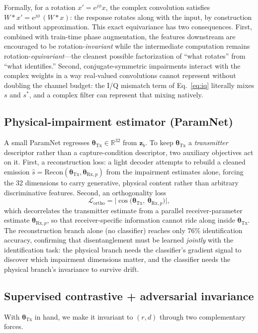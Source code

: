 \documentclass[journal]{IEEEtran}
\newcommand{\tx}{\boldsymbol{\theta}_{\mathrm{Tx}}}
\newcommand{\rxp}{\boldsymbol{\theta}_{\mathrm{Rx},p}}
\begin{document}
Formally, for a rotation $x' = e^{j\phi} x$, the complex convolution satisfies $W * x' = e^{j\phi}\,(W * x)$: the response rotates along with the input, by construction and without approximation. This exact equivariance has two consequences. First, combined with train-time phase augmentation, the features downstream are encouraged to be rotation-\emph{invariant} while the intermediate computation remains rotation-\emph{equivariant}---the cleanest possible factorization of ``what rotates'' from ``what identifies.'' Second, conjugate-symmetric impairments interact with the complex weights in a way real-valued convolutions cannot represent without doubling the channel budget: the I/Q mismatch term of Eq.~\eqref{eq:iq} literally mixes $s$ and $s^{*}$, and a complex filter can represent that mixing natively.

\subsection{Physical-impairment estimator (ParamNet)}
\label{sec:paramnet}
A small ParamNet regresses $\tx\in\mathbb{R}^{32}$ from $\mathbf{z}_b$. To keep $\tx$ a \emph{transmitter} descriptor rather than a capture-condition descriptor, two auxiliary objectives act on it. First, a reconstruction loss: a light decoder attempts to rebuild a cleaned emission $\hat{s}=\mathrm{Recon}(\tx,\rxp)$ from the impairment estimates alone, forcing the 32 dimensions to carry generative, physical content rather than arbitrary discriminative features. Second, an orthogonality loss
\begin{equation}
\mathcal{L}_{\mathrm{ortho}} = \big|\cos\big(\tx,\ \rxp\big)\big|,
\label{eq:ortho}
\end{equation}
which decorrelates the transmitter estimate from a parallel receiver-parameter estimate $\rxp$, so that receiver-specific information cannot ride along inside $\tx$. The reconstruction branch alone (no classifier) reaches only 76\% identification accuracy, confirming that disentanglement must be learned \emph{jointly} with the identification task: the physical branch needs the classifier's gradient signal to discover which impairment dimensions matter, and the classifier needs the physical branch's invariance to survive drift.

\subsection{Supervised contrastive + adversarial invariance}
\label{sec:invariance}
With $\tx$ in hand, we make it invariant to $(r,d)$ through two complementary forces.
\end{document}
